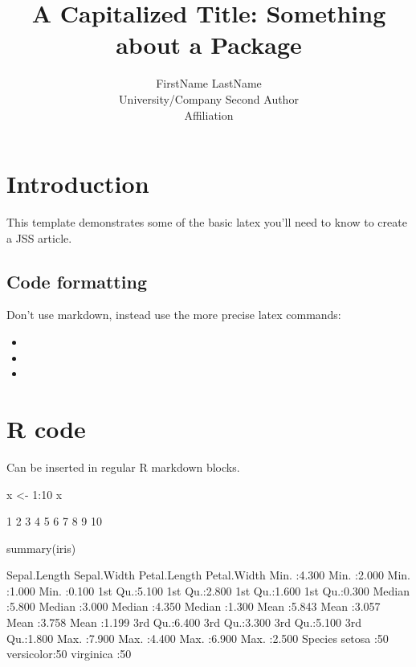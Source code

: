 \documentclass[article]{jss}
\author{
FirstName LastName\\University/Company \And Second Author\\Affiliation
}
\title{A Capitalized Title: Something about a Package \pkg{foo}}
\providecommand{\tightlist}{%
  \setlength{\itemsep}{0pt}\setlength{\parskip}{0pt}}
\begin{document}
\section{Introduction}\label{introduction}

This template demonstrates some of the basic latex you'll need to know
to create a JSS article.

\subsection{Code formatting}\label{code-formatting}

Don't use markdown, instead use the more precise latex commands:

\begin{itemize}
\tightlist
\item
\item
\item
\end{itemize}

\section{R code}\label{r-code}

Can be inserted in regular R markdown blocks.

\begin{CodeChunk}
\begin{CodeInput}
x <- 1:10
x
\end{CodeInput}
\begin{CodeOutput}
 [1]  1  2  3  4  5  6  7  8  9 10
\end{CodeOutput}
\end{CodeChunk}

\begin{CodeChunk}
\begin{CodeInput}
summary(iris)
\end{CodeInput}
\begin{CodeOutput}
  Sepal.Length    Sepal.Width     Petal.Length    Petal.Width   
 Min.   :4.300   Min.   :2.000   Min.   :1.000   Min.   :0.100  
 1st Qu.:5.100   1st Qu.:2.800   1st Qu.:1.600   1st Qu.:0.300  
 Median :5.800   Median :3.000   Median :4.350   Median :1.300  
 Mean   :5.843   Mean   :3.057   Mean   :3.758   Mean   :1.199  
 3rd Qu.:6.400   3rd Qu.:3.300   3rd Qu.:5.100   3rd Qu.:1.800  
 Max.   :7.900   Max.   :4.400   Max.   :6.900   Max.   :2.500  
       Species  
 setosa    :50  
 versicolor:50  
 virginica :50  
                
                
                
\end{CodeOutput}
\end{CodeChunk}
\end{document}
